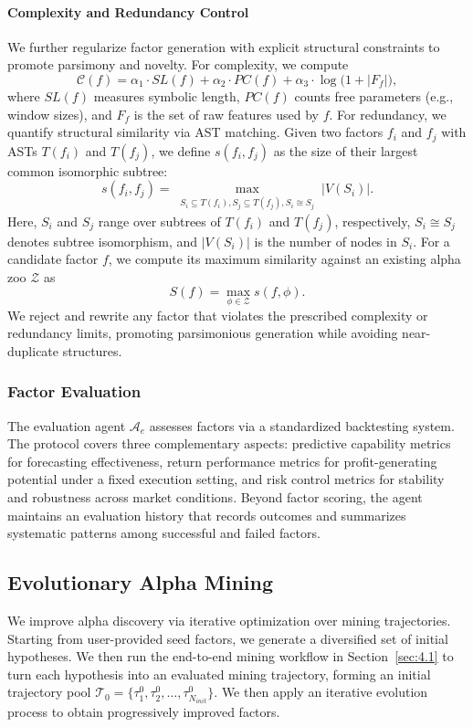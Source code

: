 \paragraph{Complexity and Redundancy Control} We further regularize factor generation with explicit structural constraints to promote parsimony and novelty. For complexity, we compute
\begin{equation}
\mathcal{C}(f)
= \alpha_1 \cdot SL(f)
+ \alpha_2 \cdot PC(f)
+ \alpha_3 \cdot \log\!\bigl(1 + |F_f|\bigr),
\label{eq:factor_complexity}
\end{equation}
where $SL(f)$ measures symbolic length, $PC(f)$ counts free parameters (e.g., window sizes), and $F_f$ is the set of raw features used by $f$. For redundancy, we quantify structural similarity via AST matching. Given two factors $f_i$ and $f_j$ with ASTs $T(f_i)$ and $T(f_j)$, we define $s(f_i,f_j)$ as the size of their largest common isomorphic subtree:
\begin{equation}
s(f_i,f_j)
=\max_{\substack{S_i \subseteq T(f_i), S_j \subseteq T(f_j), S_i \cong S_j}} |V(S_i)|.
\end{equation}
Here, $S_i$ and $S_j$ range over subtrees of $T(f_i)$ and $T(f_j)$, respectively, $S_i \cong S_j$ denotes subtree isomorphism, and $|V(S_i)|$ is the number of nodes in $S_i$. For a candidate factor $f$, we compute its maximum similarity against an existing alpha zoo $\mathcal{Z}$ as 
\begin{equation}
S(f)=\max_{\phi\in\mathcal{Z}} s(f,\phi).
\label{eq:max_similarity}
\end{equation}
We reject and rewrite any factor that violates the prescribed complexity or redundancy limits, promoting parsimonious generation while avoiding near-duplicate structures.
\subsubsection{Factor Evaluation} 
The evaluation agent $\mathcal{A}_{e}$ assesses factors via a standardized backtesting system. The protocol covers three complementary aspects: predictive capability metrics for forecasting effectiveness, return performance metrics for profit-generating potential under a fixed execution setting, and risk control metrics for stability and robustness across market conditions. Beyond factor scoring, the agent maintains an evaluation history that records outcomes and summarizes systematic patterns among successful and failed factors.

\subsection{Evolutionary Alpha Mining}
\label{sec:4.2}
We improve alpha discovery via iterative optimization over mining trajectories. Starting from user-provided seed factors, we generate a diversified set of initial hypotheses. We then run the end-to-end mining workflow in Section~\ref{sec:4.1} to turn each hypothesis into an evaluated mining trajectory, forming an initial trajectory pool $\mathcal{T}_0=\{\tau_1^0,\tau_2^0,\ldots,\tau_{N_{init}}^0\}$. We then apply an iterative evolution process to obtain progressively improved factors.
